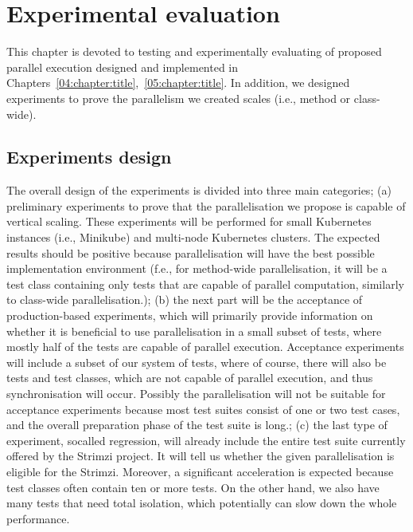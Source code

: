\chapter{Experimental evaluation}
\label{06:chapter:title}

This chapter is devoted to testing and experimentally evaluating of proposed parallel execution designed and implemented in
Chapters~\ref{04:chapter:title},~\ref{05:chapter:title}.
In addition, we designed experiments to prove the parallelism we created scales (i.e., method or class-wide).

\section{Experiments design}

The overall design of the experiments is divided into three main categories;
(a) preliminary experiments to prove that the parallelisation we propose is capable of vertical scaling.
These experiments will be performed for small Kubernetes instances (i.e., Minikube) and multi-node Kubernetes clusters.
The expected results should be positive because parallelisation will have the best possible implementation environment
(f.e., for method-wide parallelisation, it will be a test class containing only tests that are capable of parallel computation,
similarly to class-wide parallelisation.);
(b) the next part will be the acceptance of production-based experiments, which will primarily provide information on whether it is beneficial
to use parallelisation in a small subset of tests, where mostly half of the tests are capable of parallel execution.
Acceptance experiments will include a subset of our system of tests, where of course, there will also be tests and test classes,
which are not capable of parallel execution, and thus synchronisation will occur.
Possibly the parallelisation will not be suitable for acceptance experiments because most test suites consist of one or two test cases,
and the overall preparation phase of the test suite is long.;
(c) the last type of experiment, so\-called regression, will already include the entire test suite currently offered by the Strimzi project.
It will tell us whether the given parallelisation is eligible for the Strimzi.
Moreover, a significant acceleration is expected because test classes often contain ten or more tests.
On the other hand, we also have many tests that need total isolation, which potentially can slow down the whole performance.

